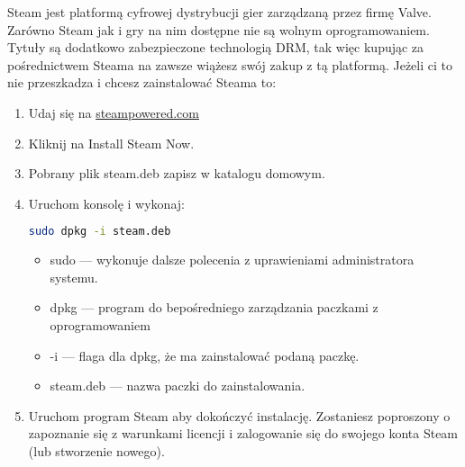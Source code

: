 Steam jest platformą cyfrowej dystrybucji gier zarządzaną przez firmę Valve. Zarówno Steam jak i gry na nim dostępne nie są wolnym oprogramowaniem. Tytuły są dodatkowo zabezpieczone technologią DRM, tak więc kupując za pośrednictwem Steama na zawsze wiążesz swój zakup z tą platformą. Jeżeli ci to nie przeszkadza i chcesz zainstalować Steama to:
\begin{enumerate}
\item Udaj się na \href{http://store.steampowered.com/about/}{steampowered.com}
\item Kliknij na \textcolor{ubuntu_orange}{Install Steam Now}.
\item Pobrany plik steam.deb zapisz w katalogu domowym.
\item Uruchom konsolę  i wykonaj:
\begin{lstlisting}[language=bash]
sudo dpkg -i steam.deb
\end{lstlisting}
\begin{itemize}
\item \textcolor{ubuntu_orange}{sudo} --- wykonuje dalsze polecenia z uprawieniami administratora systemu.
\item \textcolor{ubuntu_orange}{dpkg} --- program do bepośredniego zarządzania paczkami z oprogramowaniem
\item \textcolor{ubuntu_orange}{-i} --- flaga dla dpkg, że ma zainstalować podaną paczkę.
\item \textcolor{ubuntu_orange}{steam.deb} --- nazwa paczki do zainstalowania.
\end{itemize}
\item Uruchom program Steam aby dokończyć instalację. Zostaniesz poproszony o zapoznanie się z warunkami licencji i zalogowanie się do swojego konta Steam (lub stworzenie nowego).
\end{enumerate}